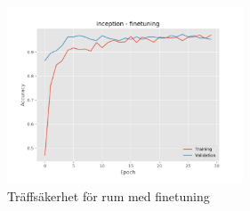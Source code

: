 \documentclass[]{kththesis}
\begin{document}
\begin{figure}[h]
    \includegraphics[width=7cm]{r_a_inception_fine}
    \caption{Träffsäkerhet för rum med finetuning}
    \label{fig:r_a_2}
  \end{figure}

\tailmatter
\end{document}
